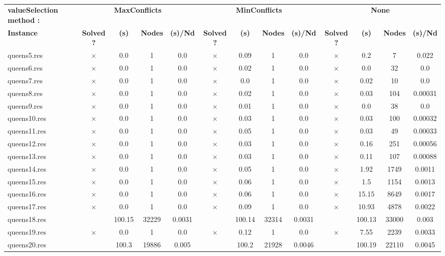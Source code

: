 \documentclass[main.tex]{subfiles}
\begin{document}
\thispagestyle{empty}

\begin{landscape}
\begin{center}
\begin{table}[h]
\centering
\caption{}
\label{}
\renewcommand{\arraystretch}{1.4} 
\begin{tabular}{|l|cccc|cccc|cccc|}
	\hline
\textbf{valueSelection method :} & \multicolumn{4}{c}{\textbf{MaxConflicts}} & \multicolumn{4}{c}{\textbf{MinConflicts}} & \multicolumn{4}{c}{\textbf{None}}\\
\textbf{Instance}  & \textbf{Solved ?} & \textbf{(s)} & \textbf{Nodes} & \textbf{(s)/Nd} & \textbf{Solved ?} & \textbf{(s)} & \textbf{Nodes} & \textbf{(s)/Nd} & \textbf{Solved ?} & \textbf{(s)} & \textbf{Nodes} & \textbf{(s)/Nd}\\\hline

queens5.res & $\times$ & 0.0 & 1 & 0.0
 & $\times$ & 0.09 & 1 & 0.0
 & $\times$ & 0.2 & 7 & 0.022
\\
queens6.res & $\times$ & 0.0 & 1 & 0.0
 & $\times$ & 0.02 & 1 & 0.0
 & $\times$ & 0.0 & 32 & 0.0
\\
queens7.res & $\times$ & 0.0 & 1 & 0.0
 & $\times$ & 0.0 & 1 & 0.0
 & $\times$ & 0.02 & 10 & 0.0
\\
queens8.res & $\times$ & 0.0 & 1 & 0.0
 & $\times$ & 0.02 & 1 & 0.0
 & $\times$ & 0.03 & 104 & 0.00031
\\
queens9.res & $\times$ & 0.0 & 1 & 0.0
 & $\times$ & 0.01 & 1 & 0.0
 & $\times$ & 0.0 & 38 & 0.0
\\
queens10.res & $\times$ & 0.0 & 1 & 0.0
 & $\times$ & 0.03 & 1 & 0.0
 & $\times$ & 0.03 & 100 & 0.00032
\\
queens11.res & $\times$ & 0.0 & 1 & 0.0
 & $\times$ & 0.05 & 1 & 0.0
 & $\times$ & 0.03 & 49 & 0.00033
\\
queens12.res & $\times$ & 0.0 & 1 & 0.0
 & $\times$ & 0.03 & 1 & 0.0
 & $\times$ & 0.16 & 251 & 0.00056
\\
queens13.res & $\times$ & 0.0 & 1 & 0.0
 & $\times$ & 0.03 & 1 & 0.0
 & $\times$ & 0.11 & 107 & 0.00088
\\
queens14.res & $\times$ & 0.0 & 1 & 0.0
 & $\times$ & 0.05 & 1 & 0.0
 & $\times$ & 1.92 & 1749 & 0.0011
\\
queens15.res & $\times$ & 0.0 & 1 & 0.0
 & $\times$ & 0.06 & 1 & 0.0
 & $\times$ & 1.5 & 1154 & 0.0013
\\
queens16.res & $\times$ & 0.0 & 1 & 0.0
 & $\times$ & 0.06 & 1 & 0.0
 & $\times$ & 15.15 & 8649 & 0.0017
\\
queens17.res & $\times$ & 0.0 & 1 & 0.0
 & $\times$ & 0.09 & 1 & 0.0
 & $\times$ & 10.93 & 4878 & 0.0022
\\
queens18.res &  & 100.15 & 32229 & 0.0031
 &  & 100.14 & 32314 & 0.0031
 &  & 100.13 & 33000 & 0.003
\\
queens19.res & $\times$ & 0.0 & 1 & 0.0
 & $\times$ & 0.12 & 1 & 0.0
 & $\times$ & 7.55 & 2239 & 0.0033
\\
queens20.res &  & 100.3 & 19886 & 0.005
 &  & 100.2 & 21928 & 0.0046
 &  & 100.19 & 22110 & 0.0045
\\


\end{tabular}
\end{table}
\end{center}
\end{landscape}
\end{document}
